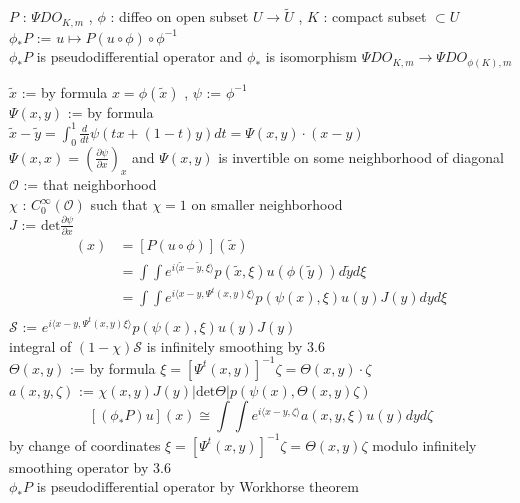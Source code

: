 \begin{Theorem}
\itemwhen
  \For \(P\) : \(\Psi DO_{K,m}\) , \(\phi\) : diffeo on open subset \(U \to \tilde{U}\) , \(K\) : compact subset \(\subset U\) \\
  \Define \(\phi_* P\) := \(u \mapsto P(u \circ \phi) \circ \phi^{-1}\) \\
  \Then \(\phi_* P\) is pseudodifferential operator and \(\phi_*\) is isomorphism \(\Psi DO_{K,m} \to \Psi DO_{\phi(K),m}\)
\end{Theorem}

\begin{Proof}
\itemprop
  \Define \(\tilde{x}\) := by formula \(x = \phi(\tilde{x})\) , \(\psi\) := \(\phi^{-1}\) \\
  \Define \(\Psi(x,y)\) := by formula \(\tilde{x} - \tilde{y} = \int_0^1 \frac{d}{dt} \psi (tx + (1-t)y) dt = \Psi(x,y) \cdot (x-y)\) \\
  \Then \(\Psi(x,x) = (\frac{\partial \psi}{\partial x})_x\) and \(\Psi(x,y)\) is invertible on some neighborhood of diagonal \\
  \Define \(\mathscr{O}\) := that neighborhood \\
  \Take \(\chi\) : \(C^\infty_0(\mathscr{O})\) such that \(\chi = 1\) on smaller neighborhood \\
  \Define \(J\) := \(\text{det} \frac{\partial \psi}{\partial x}\) \\
  \Then
  \begin{align*}
   [(\phi_* P)u](x) &= [P(u \circ \phi)] (\tilde{x}) \\
   &= \int \int e^{i \langle \tilde{x} - \tilde{y} , \xi \rangle} p(\tilde{x} , \xi) u(\phi(\tilde{y})) d\tilde{y} d\xi \\
   &= \int \int e^{i \langle x - y , \Psi^t(x,y) \xi \rangle} p(\psi(x) , \xi) u(y) J(y) dy d\xi \\
  \end{align*}
  \Define \(\mathscr{S}\) := \(e^{i \langle x - y , \Psi^t(x,y) \xi \rangle} p(\psi(x) , \xi) u(y) J(y)\) \\
  \Then integral of \((1 - \chi) \mathscr{S}\) is infinitely smoothing by 3.6 \\
  \Define \(\Theta(x,y)\) := by formula \(\xi = [\Psi^t(x,y)]^{-1}\zeta = \Theta(x,y) \cdot \zeta\) \\
  \Define \(a(x,y,\zeta)\) := \(\chi(x,y) J(y) \lvert \text{det} \Theta \rvert p(\psi(x) , \Theta(x,y) \zeta)\) \\
  \Then
  \[
    [(\phi_* P)u](x) \cong \int\int e^{i \langle x-y,\zeta \rangle} a(x,y,\xi) u(y) dy d\zeta
  \]
  by change of coordinates \(\xi = [\Psi^t(x,y)]^{-1} \zeta = \Theta(x,y) \zeta\) modulo infinitely smoothing operator by 3.6 \\
  \Then \(\phi_* P\) is pseudodifferential operator by Workhorse theorem
\end{Proof}

